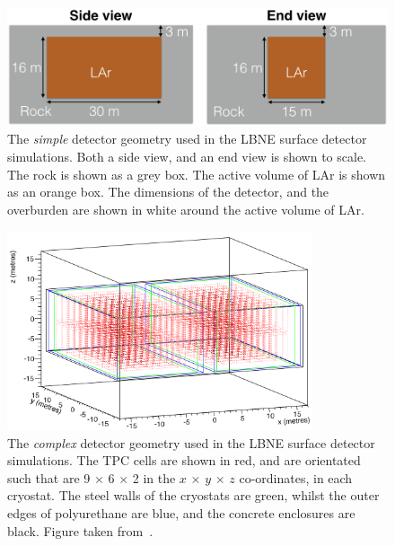 \begin{figure}
  \centering
  \includegraphics[width=\textwidth]{SimpleDetector}
  \caption[The \emph{simple} detector geometry used in the LBNE surface detector simulations]
          {The \emph{simple} detector geometry used in the LBNE surface detector simulations. Both a side view, and an end view is shown to scale. The rock is shown as a grey box. The active volume of LAr is shown as an orange box. The dimensions of the detector, and the overburden are shown in white around the active volume of LAr.}
  \label{fig:SurfSimpGeom}
\end{figure}

\begin{figure}
  \centering
  \includegraphics[width=0.8\textwidth]{ComplexGeom}
  \caption[The \emph{complex} detector geometry used in the LBNE surface detector simulations]
          {The \emph{complex} detector geometry used in the LBNE surface detector simulations. The TPC cells are shown in red, and are orientated such that are 9 $\times$ 6 $\times$ 2 in the $x$ $\times$ $y$ $\times$ $z$ co-ordinates, in each cryostat. The steel walls of the cryostats are green, whilst the outer edges of polyurethane are blue, and the concrete enclosures are black. Figure taken from~\citep{MartinsThesis}.}
  \label{fig:SurfCompGeom}
\end{figure}

